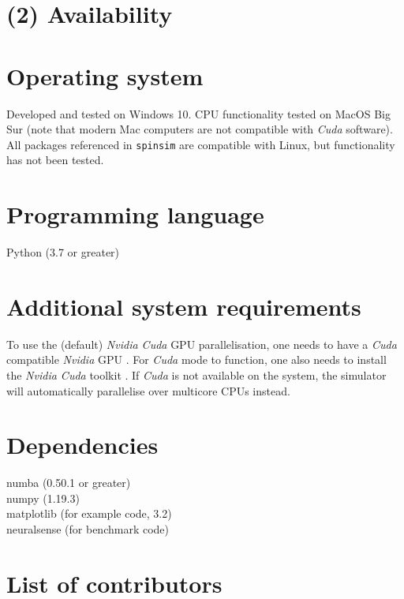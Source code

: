 \documentclass{jors}
\begin{document}
\section*{(2) Availability}
\vspace{0.5cm}
\section*{Operating system}
Developed and tested on Windows 10. CPU functionality tested on MacOS Big Sur (note that modern Mac computers are not compatible with \emph{Cuda} software). All packages referenced in \texttt{spinsim} are compatible with Linux, but functionality has not been tested.

\section*{Programming language}
Python (3.7 or greater)

\section*{Additional system requirements}
To use the (default) \emph{Nvidia Cuda} GPU parallelisation, one needs to have a \emph{Cuda} compatible \emph{Nvidia} GPU \cite{noauthor_cuda_2012}. For \emph{Cuda} mode to function, one also needs to install the \emph{Nvidia Cuda} toolkit \cite{noauthor_cuda_2013}. If \emph{Cuda} is not available on the system, the simulator will automatically parallelise over multicore CPUs instead.

\section*{Dependencies}
numba (0.50.1 or greater)\\
numpy (1.19.3)\\
matplotlib (for example code, 3.2)\\
neuralsense (for benchmark code)

\section*{List of contributors}
\end{document}
